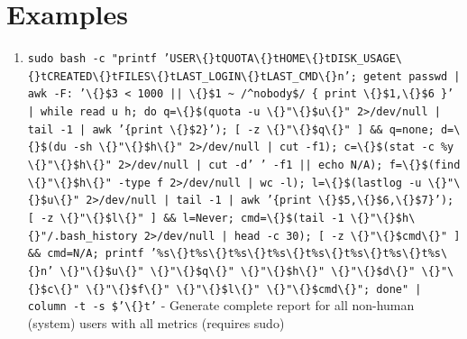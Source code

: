 \documentclass{article}
\begin{document}
\section*{Examples}
\begin{enumerate}
  \item \texttt{sudo bash -c "printf 'USER\textbackslash\{\}tQUOTA\textbackslash\{\}tHOME\textbackslash\{\}tDISK\_USAGE\textbackslash\{\}tCREATED\textbackslash\{\}tFILES\textbackslash\{\}tLAST\_LOGIN\textbackslash\{\}tLAST\_CMD\textbackslash\{\}n'; getent passwd | awk -F: '\textbackslash\{\}\$3 < 1000 || \textbackslash\{\}\$1 \textasciitilde{} /\textasciicircum{}nobody\$/ \{ print \textbackslash\{\}\$1,\textbackslash\{\}\$6 \}' | while read u h; do q=\textbackslash\{\}\$(quota -u \textbackslash\{\}"\textbackslash\{\}\$u\textbackslash\{\}" 2>/dev/null | tail -1 | awk '\{print \textbackslash\{\}\$2\}'); [ -z \textbackslash\{\}"\textbackslash\{\}\$q\textbackslash\{\}" ] \&\& q=none; d=\textbackslash\{\}\$(du -sh \textbackslash\{\}"\textbackslash\{\}\$h\textbackslash\{\}" 2>/dev/null | cut -f1); c=\textbackslash\{\}\$(stat -c \%y \textbackslash\{\}"\textbackslash\{\}\$h\textbackslash\{\}" 2>/dev/null | cut -d' ' -f1 || echo N/A); f=\textbackslash\{\}\$(find \textbackslash\{\}"\textbackslash\{\}\$h\textbackslash\{\}" -type f 2>/dev/null | wc -l); l=\textbackslash\{\}\$(lastlog -u \textbackslash\{\}"\textbackslash\{\}\$u\textbackslash\{\}" 2>/dev/null | tail -1 | awk '\{print \textbackslash\{\}\$5,\textbackslash\{\}\$6,\textbackslash\{\}\$7\}'); [ -z \textbackslash\{\}"\textbackslash\{\}\$l\textbackslash\{\}" ] \&\& l=Never; cmd=\textbackslash\{\}\$(tail -1 \textbackslash\{\}"\textbackslash\{\}\$h\textbackslash\{\}"/.bash\_history 2>/dev/null | head -c 30); [ -z \textbackslash\{\}"\textbackslash\{\}\$cmd\textbackslash\{\}" ] \&\& cmd=N/A; printf '\%s\textbackslash\{\}t\%s\textbackslash\{\}t\%s\textbackslash\{\}t\%s\textbackslash\{\}t\%s\textbackslash\{\}t\%s\textbackslash\{\}t\%s\textbackslash\{\}t\%s\textbackslash\{\}n' \textbackslash\{\}"\textbackslash\{\}\$u\textbackslash\{\}" \textbackslash\{\}"\textbackslash\{\}\$q\textbackslash\{\}" \textbackslash\{\}"\textbackslash\{\}\$h\textbackslash\{\}" \textbackslash\{\}"\textbackslash\{\}\$d\textbackslash\{\}" \textbackslash\{\}"\textbackslash\{\}\$c\textbackslash\{\}" \textbackslash\{\}"\textbackslash\{\}\$f\textbackslash\{\}" \textbackslash\{\}"\textbackslash\{\}\$l\textbackslash\{\}" \textbackslash\{\}"\textbackslash\{\}\$cmd\textbackslash\{\}"; done" | column -t -s \$'\textbackslash\{\}t'} - Generate complete report for all non-human (system) users with all metrics (requires sudo)

\end{enumerate}
\end{document}
